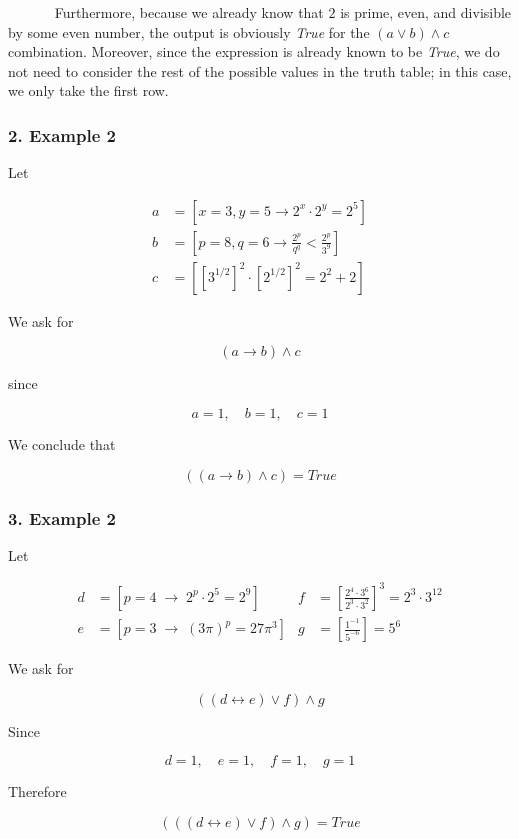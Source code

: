 ~~~~~~ Furthermore, because we already know that \(2\) is prime, even,
and divisible by some even number, the output is obviously \emph{True}
for the \((a \lor b) \land c\) combination. Moreover, since the
expression is already known to be \emph{True}, we do not need to
consider the rest of the possible values in the truth table; in this
case, we only take the first row.

\subsubsection{2. Example 2}\label{example-2}

Let

\[ 
\begin{align*}
a &= \displaystyle\left[ x = 3, y = 5 \to 2^x \cdot 2^y = 2^5 \right]\\
b &= \left[p = 8, q = 6 \to \frac{2^p}{q^q} < \frac{2^p}{3^9}\right]\\
c &= \left[\left[3^{1/2}\right]^2 \cdot \left[2^{1/2}\right]^2 = 2^2+2 \right] 
\end{align*}\]

We ask for

\[(a \to b) \land c\]

since

\[ a = 1, \quad b= 1, \quad c= 1\]

We conclude that

\[\boxed{((a \to b) \land c )= True}\]

\subsubsection{3. Example 2}\label{example-2-1}

Let

\[
\begin{align*}
d &= \left[p=4 \;\to\; 2^p \cdot 2^5 = 2^9 \right] &
f &= \left[\frac{2^4 \cdot 3^6}{2^3 \cdot 3^2}\right]^3 = 2^3 \cdot 3^{12} \\[1mm]
e &= \left[p=3 \;\to\; (3\pi)^p = 27\pi^3 \right] &
g &= \left[\frac{1^{-1}}{5^{-6}} \right] = 5^6
\end{align*}
\]

We ask for

\[
((d \leftrightarrow e) \lor f) \land g
\]

Since

\[
d = 1, \quad e = 1, \quad f = 1 , \quad g = 1
\]

Therefore

\[
\boxed{(((d \leftrightarrow e) \lor f) \land g )= True}
\]

